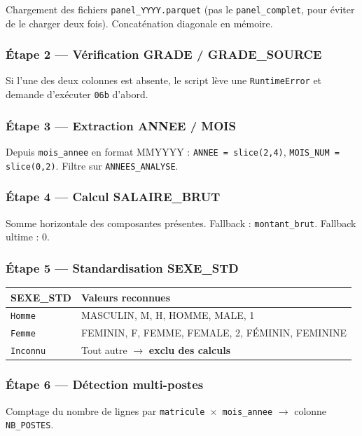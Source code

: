 \documentclass[12pt,a4paper,french]{report}
\begin{document}
Chargement des fichiers \texttt{panel\_YYYY.parquet} (pas le
\texttt{panel\_complet}, pour éviter de le charger deux fois). Concaténation
diagonale en mémoire.

\subsubsection{Étape 2 — Vérification GRADE / GRADE\_SOURCE}

Si l'une des deux colonnes est absente, le script lève une
\texttt{RuntimeError} et demande d'exécuter \texttt{06b} d'abord.

\subsubsection{Étape 3 — Extraction ANNEE / MOIS}

Depuis \texttt{mois\_annee} en format MMYYYY :
\texttt{ANNEE = slice(2,4)}, \texttt{MOIS\_NUM = slice(0,2)}.
Filtre sur \texttt{ANNEES\_ANALYSE}.

\subsubsection{Étape 4 — Calcul SALAIRE\_BRUT}

Somme horizontale des composantes présentes. Fallback :
\texttt{montant\_brut}. Fallback ultime : 0.

\subsubsection{Étape 5 — Standardisation SEXE\_STD}

\begin{tabularx}{\textwidth}{lX}
  \toprule
  \textbf{SEXE\_STD} & \textbf{Valeurs reconnues} \\
  \midrule
  \texttt{Homme} & MASCULIN, M, H, HOMME, MALE, 1 \\
  \texttt{Femme} & FEMININ, F, FEMME, FEMALE, 2, FÉMININ, FEMININE \\
  \texttt{Inconnu} & Tout autre $\rightarrow$ \textbf{exclu des calculs} \\
  \bottomrule
\end{tabularx}

\subsubsection{Étape 6 — Détection multi-postes}

Comptage du nombre de lignes par \texttt{matricule $\times$ mois\_annee}
$\rightarrow$ colonne \texttt{NB\_POSTES}.
\end{document}
